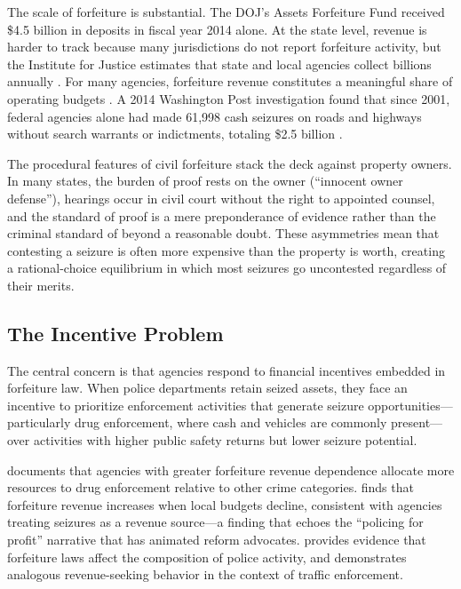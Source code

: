 \documentclass[12pt]{article}
\begin{document}
The scale of forfeiture is substantial. The DOJ's Assets Forfeiture Fund received \$4.5 billion in deposits in fiscal year 2014 alone. At the state level, revenue is harder to track because many jurisdictions do not report forfeiture activity, but the Institute for Justice estimates that state and local agencies collect billions annually \citep{ij2020policing, ericksonburns2016}. For many agencies, forfeiture revenue constitutes a meaningful share of operating budgets \citep{worrall2001addicted}. A 2014 Washington Post investigation found that since 2001, federal agencies alone had made 61,998 cash seizures on roads and highways without search warrants or indictments, totaling \$2.5 billion \citep{ross2016assets}.

The procedural features of civil forfeiture stack the deck against property owners. In many states, the burden of proof rests on the owner (``innocent owner defense''), hearings occur in civil court without the right to appointed counsel, and the standard of proof is a mere preponderance of evidence rather than the criminal standard of beyond a reasonable doubt. These asymmetries mean that contesting a seizure is often more expensive than the property is worth, creating a rational-choice equilibrium in which most seizures go uncontested regardless of their merits.

\subsection{The Incentive Problem}

The central concern is that agencies respond to financial incentives embedded in forfeiture law. When police departments retain seized assets, they face an incentive to prioritize enforcement activities that generate seizure opportunities---particularly drug enforcement, where cash and vehicles are commonly present---over activities with higher public safety returns but lower seizure potential.

\citet{worrall2010use} documents that agencies with greater forfeiture revenue dependence allocate more resources to drug enforcement relative to other crime categories. \citet{kelly2019asset} finds that forfeiture revenue increases when local budgets decline, consistent with agencies treating seizures as a revenue source---a finding that echoes the ``policing for profit'' narrative that has animated reform advocates. \citet{carpenter2011civil} provides evidence that forfeiture laws affect the composition of police activity, and \citet{makowsky2019municipal} demonstrates analogous revenue-seeking behavior in the context of traffic enforcement.
\end{document}
